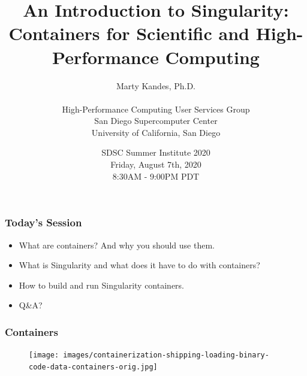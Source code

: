 \documentclass{beamer}
\title{An Introduction to Singularity: \\
       \small Containers for Scientific and High-Performance Computing}
\author{Marty Kandes, Ph.D. \\ \ \\
   \small High-Performance Computing User Services Group \\
          San Diego Supercomputer Center \\
          University of California, San Diego}
\date{\small SDSC Summer Institute 2020 \\
             Friday, August 7th, 2020 \\
             8:30AM - 9:00PM PDT}
\begin{document}
\maketitle

\begin{frame}
   \frametitle{Today's Session}
   \begin{itemize}
      \setlength\itemsep{1.0em}
      \item What are containers? And why you should use them.
      \item What is Singularity and what does it have to do with containers?
      \item How to build and run Singularity containers.
      \item Q\&A?
   \end{itemize}
\end{frame}

\begin{frame}
   \frametitle{Containers}
   \vspace{-1.0em}
   \begin{figure}[htbp]
      \texttt{[image: images/containerization-shipping-loading-binary-code-data-containers-orig.jpg]}
   \end{figure} 
\end{frame}
\end{document}
